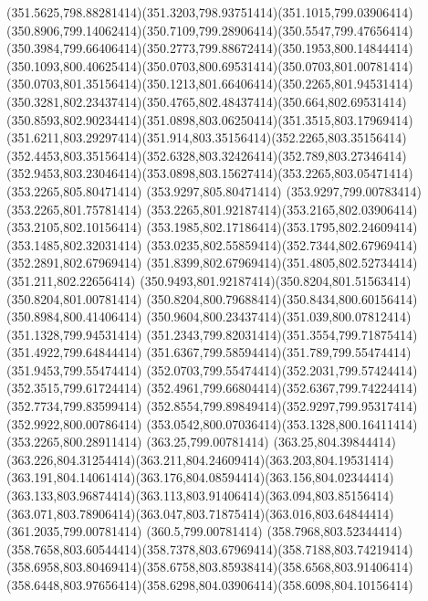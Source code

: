 {{	\curveto(351.5625,798.88281414)(351.3203,798.93751414)(351.1015,799.03906414)
	\curveto(350.8906,799.14062414)(350.7109,799.28906414)(350.5547,799.47656414)
	\curveto(350.3984,799.66406414)(350.2773,799.88672414)(350.1953,800.14844414)
	\curveto(350.1093,800.40625414)(350.0703,800.69531414)(350.0703,801.00781414)
	\curveto(350.0703,801.35156414)(350.1213,801.66406414)(350.2265,801.94531414)
	\curveto(350.3281,802.23437414)(350.4765,802.48437414)(350.664,802.69531414)
	\curveto(350.8593,802.90234414)(351.0898,803.06250414)(351.3515,803.17969414)
	\curveto(351.6211,803.29297414)(351.914,803.35156414)(352.2265,803.35156414)
	\curveto(352.4453,803.35156414)(352.6328,803.32426414)(352.789,803.27346414)
	\curveto(352.9453,803.23046414)(353.0898,803.15627414)(353.2265,803.05471414)
	\lineto(353.2265,805.80471414)
	\lineto(353.9297,805.80471414)
	\lineto(353.9297,799.00783414)
	\closepath
	\moveto(353.2265,801.75781414)
	\curveto(353.2265,801.92187414)(353.2165,802.03906414)(353.2105,802.10156414)
	\curveto(353.1985,802.17186414)(353.1795,802.24609414)(353.1485,802.32031414)
	\curveto(353.0235,802.55859414)(352.7344,802.67969414)(352.2891,802.67969414)
	\curveto(351.8399,802.67969414)(351.4805,802.52734414)(351.211,802.22656414)
	\curveto(350.9493,801.92187414)(350.8204,801.51563414)(350.8204,801.00781414)
	\curveto(350.8204,800.79688414)(350.8434,800.60156414)(350.8984,800.41406414)
	\curveto(350.9604,800.23437414)(351.039,800.07812414)(351.1328,799.94531414)
	\curveto(351.2343,799.82031414)(351.3554,799.71875414)(351.4922,799.64844414)
	\curveto(351.6367,799.58594414)(351.789,799.55474414)(351.9453,799.55474414)
	\curveto(352.0703,799.55474414)(352.2031,799.57424414)(352.3515,799.61724414)
	\curveto(352.4961,799.66804414)(352.6367,799.74224414)(352.7734,799.83599414)
	\curveto(352.8554,799.89849414)(352.9297,799.95317414)(352.9922,800.00786414)
	\curveto(353.0542,800.07036414)(353.1328,800.16411414)(353.2265,800.28911414)
	\closepath
	\moveto(363.25,799.00781414)
	\lineto(363.25,804.39844414)
	\curveto(363.226,804.31254414)(363.211,804.24609414)(363.203,804.19531414)
	\curveto(363.191,804.14061414)(363.176,804.08594414)(363.156,804.02344414)
	\curveto(363.133,803.96874414)(363.113,803.91406414)(363.094,803.85156414)
	\curveto(363.071,803.78906414)(363.047,803.71875414)(363.016,803.64844414)
	\lineto(361.2035,799.00781414)
	\lineto(360.5,799.00781414)
	\lineto(358.7968,803.52344414)
	\curveto(358.7658,803.60544414)(358.7378,803.67969414)(358.7188,803.74219414)
	\curveto(358.6958,803.80469414)(358.6758,803.85938414)(358.6568,803.91406414)
	\curveto(358.6448,803.97656414)(358.6298,804.03906414)(358.6098,804.10156414)
}}
